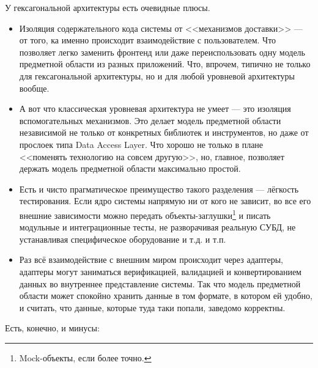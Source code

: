 \documentclass[a5paper]{article}
\begin{document}
У гексагональной архитектуры есть очевидные плюсы.

\begin{itemize}
    \item Изоляция содержательного кода системы от <<механизмов доставки>> --- от того, ка именно происходит взаимодействие с пользователем. Что позволяет легко заменить фронтенд или даже переиспользовать одну модель предметной области из разных приложений. Что, впрочем, типично не только для гексагональной архитектуры, но и для любой уровневой архитектуры вообще.
    \item А вот что классическая уровневая архитектура не умеет --- это изоляция вспомогательных механизмов. Это делает модель предметной области независимой не только от конкретных библиотек и инструментов, но даже от прослоек типа Data Access Layer. Что хорошо не только в плане <<поменять технологию на совсем другую>>, но, главное, позволяет держать модель предметной области максимально простой.
    \item Есть и чисто прагматическое преимущество такого разделения --- лёгкость тестирования. Если ядро системы напрямую ни от кого не зависит, во все его внешние зависимости можно передать объекты-заглушки\footnote{Mock-объекты, если более точно.} и писать модульные и интеграционные тесты, не разворачивая реальную СУБД, не устанавливая специфическое оборудование и т.д. и т.п.
    \item Раз всё взаимодействие с внешним миром происходит через адаптеры, адаптеры могут заниматься верификацией, валидацией и конвертированием данных во внутреннее представление системы. Так что модель предметной области может спокойно хранить данные в том формате, в котором ей удобно, и считать, что данные, которые туда таки попали, заведомо корректны.
\end{itemize}

Есть, конечно, и минусы:
\end{document}
